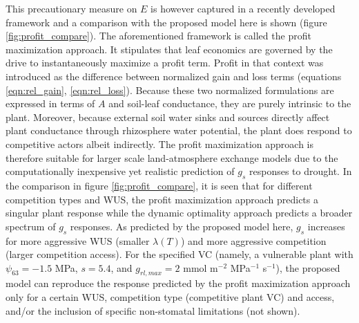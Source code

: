 \documentclass[utf8]{frontiersSCNS} %
\begin{document}
This precautionary measure on $E$ is however captured in a recently developed framework \citep{sperry_pragmatic_2016, sperry_predicting_2017} and a comparison with the proposed model here is shown (figure \ref{fig:profit_compare}). The aforementioned framework is called the profit maximization approach. It stipulates that leaf economics are governed by the drive to instantaneously maximize a profit term. Profit in that context was introduced as the difference between normalized gain and loss terms (equations \ref{eqn:rel_gain}, \ref{eqn:rel_loss}). Because these two normalized formulations are expressed in terms of $A$ and soil-leaf conductance, they are purely intrinsic to the plant. Moreover, because external soil water sinks and sources directly affect plant conductance through rhizosphere water potential, the plant does respond to competitive actors albeit indirectly. The profit maximization approach is therefore suitable for larger scale land-atmosphere exchange models due to the computationally inexpensive yet realistic prediction of $g_s$ responses to drought. In the comparison in figure \ref{fig:profit_compare}, it is seen that for different competition types and WUS, the profit maximization approach predicts a singular plant response while the dynamic optimality approach predicts a broader spectrum of $g_s$ responses. As predicted by the proposed model here, $g_s$ increases for more aggressive WUS (smaller $\lambda(T)$) and more aggressive competition (larger competition access). For the specified VC (namely, a vulnerable plant with $\psi_{63} = -1.5$ MPa, $s=5.4$, and $g_{rl,max} = 2$ mmol m$^{-2}$ MPa$^{-1}$ s$^{-1}$), the proposed model can reproduce the response predicted by the profit maximization approach only for a certain WUS, competition type (competitive plant VC) and access, and/or the inclusion of specific non-stomatal limitations (not shown).

\end{document}

